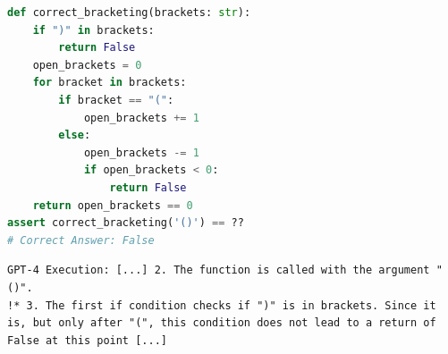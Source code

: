 \begin{lstlisting}[language=Python, frame=single]
def correct_bracketing(brackets: str):
    if ")" in brackets:
        return False
    open_brackets = 0
    for bracket in brackets:
        if bracket == "(":
            open_brackets += 1
        else:
            open_brackets -= 1
            if open_brackets < 0:
                return False
    return open_brackets == 0
assert correct_bracketing('()') == ??
# Correct Answer: False
\end{lstlisting}
\begin{lstlisting}[style=reasoning, frame=single]
GPT-4 Execution: [...] 2. The function is called with the argument "()".
!* 3. The first if condition checks if ")" is in brackets. Since it is, but only after "(", this condition does not lead to a return of False at this point [...]
\end{lstlisting}
